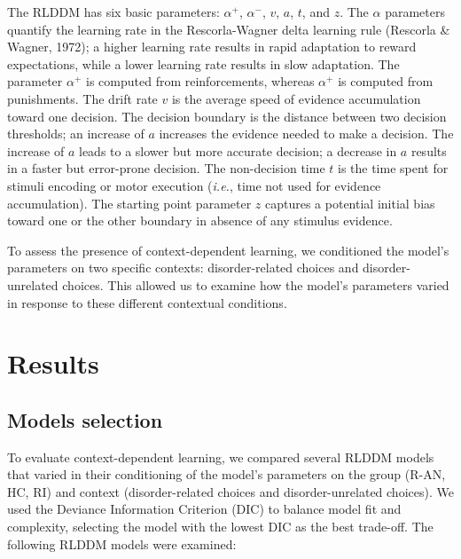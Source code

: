 \documentclass[
  man,floatsintext]{apa6}
\begin{document}
The RLDDM has six basic parameters: \(\alpha^+\), \(\alpha^-\), \(v\), \(a\), \(t\), and \(z\).
The \(\alpha\) parameters quantify the learning rate in the Rescorla-Wagner delta learning rule (Rescorla \& Wagner, 1972); a higher learning rate results in rapid adaptation to reward expectations, while a lower learning rate results in slow adaptation. The parameter \(\alpha^+\) is computed from reinforcements, whereas \(\alpha^+\) is computed from punishments. The drift rate \(v\) is the average speed of evidence accumulation toward one decision. The decision boundary is the distance between two decision thresholds; an increase of \(a\) increases the evidence needed to make a decision. The increase of \(a\) leads to a slower but more accurate decision; a decrease in \(a\) results in a faster but error-prone decision. The non-decision time \(t\) is the time spent for stimuli encoding or motor execution (\emph{i.e.}, time not used for evidence accumulation). The starting point parameter \(z\) captures a potential initial bias toward one or the other boundary in absence of any stimulus evidence.

To assess the presence of context-dependent learning, we conditioned the model's parameters on two specific contexts: disorder-related choices and disorder-unrelated choices. This allowed us to examine how the model's parameters varied in response to these different contextual conditions.

\hypertarget{results}{%
\section{Results}\label{results}}

\hypertarget{models-selection}{%
\subsection{Models selection}\label{models-selection}}

To evaluate context-dependent learning, we compared several RLDDM models that varied in their conditioning of the model's parameters on the group (R-AN, HC, RI) and context (disorder-related choices and disorder-unrelated choices). We used the Deviance Information Criterion (DIC) to balance model fit and complexity, selecting the model with the lowest DIC as the best trade-off. The following RLDDM models were examined:
\end{document}
